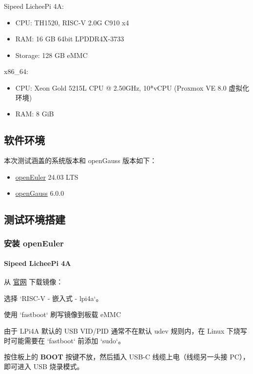\documentclass{article}
\begin{document}
Sipeed LicheePi 4A:
\begin{itemize}
    \item CPU: TH1520, RISC-V 2.0G C910 x4
    \item RAM: 16 GB 64bit LPDDR4X-3733
    \item Storage: 128 GB eMMC
\end{itemize}

x86\_64:
\begin{itemize}
    \item CPU: Xeon Gold 5215L CPU @ 2.50GHz, 10*vCPU (Proxmox VE 8.0 虚拟化环境)
    \item RAM: 8 GiB
\end{itemize}

\subsection{软件环境}
本次测试涵盖的系统版本和 openGauss 版本如下：

\begin{itemize}
    \item \href{https://www.openeuler.org/zh/download/?version=openEuler%2024.03%20LTS}{openEuler} 24.03 LTS
    \item \href{https://gitee.com/opengauss/riscv}{openGauss} 6.0.0
\end{itemize}

\subsection{测试环境搭建}

\subsubsection{安装 openEuler}

\paragraph{Sipeed LicheePi 4A}

从 \href{https://www.openeuler.org/zh/download/?version=openEuler%2024.03%20LTS}{官网} 下载镜像：

选择 `RISC-V - 嵌入式 - lpi4a`。

使用 `fastboot` 刷写镜像到板载 eMMC

由于 LPi4A 默认的 USB VID/PID 通常不在默认 udev 规则内，在 Linux 下烧写时可能需要在 `fastboot` 前添加 `sudo`。

按住板上的 \textbf{BOOT} 按键不放，然后插入 USB-C 线缆上电（线缆另一头接 PC），即可进入 USB 烧录模式。
\end{document}
